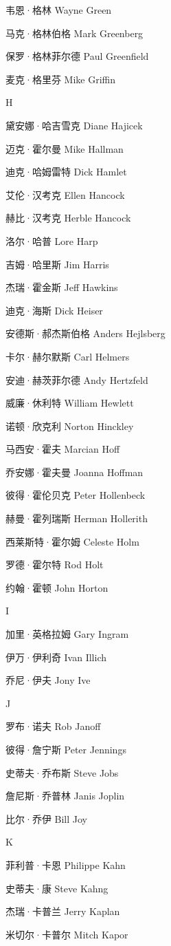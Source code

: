 \documentclass[12pt,UTF8]{ctexbook}
\begin{document}
韦恩·格林 Wayne Green

马克·格林伯格 Mark Greenberg

保罗·格林菲尔德 Paul Greenfield

麦克·格里芬 Mike Griffin

H

黛安娜·哈吉雪克 Diane Hajicek

迈克·霍尔曼 Mike Hallman

迪克·哈姆雷特 Dick Hamlet

艾伦·汉考克 Ellen Hancock

赫比·汉考克 Herble Hancock

洛尔·哈普 Lore Harp

吉姆·哈里斯 Jim Harris

杰瑞·霍金斯 Jeff Hawkins

迪克·海斯 Dick Heiser

安德斯·郝杰斯伯格 Anders Hejlsberg

卡尔·赫尔默斯 Carl Helmers

安迪·赫茨菲尔德 Andy Hertzfeld

威廉·休利特 William Hewlett

诺顿·欣克利 Norton Hinckley

马西安·霍夫 Marcian Hoff

乔安娜·霍夫曼 Joanna Hoffman

彼得·霍伦贝克 Peter Hollenbeck

赫曼·霍列瑞斯 Herman Hollerith

西莱斯特·霍尔姆 Celeste Holm

罗德·霍尔特 Rod Holt

约翰·霍顿 John Horton

I

加里·英格拉姆 Gary Ingram

伊万·伊利奇 Ivan Illich

乔尼·伊夫 Jony Ive

J

罗布·诺夫 Rob Janoff

彼得·詹宁斯 Peter Jennings

史蒂夫·乔布斯 Steve Jobs

詹尼斯·乔普林 Janis Joplin

比尔·乔伊 Bill Joy

K

菲利普·卡恩 Philippe Kahn

史蒂夫·康 Steve Kahng

杰瑞·卡普兰 Jerry Kaplan

米切尔·卡普尔 Mitch Kapor
\end{document}
